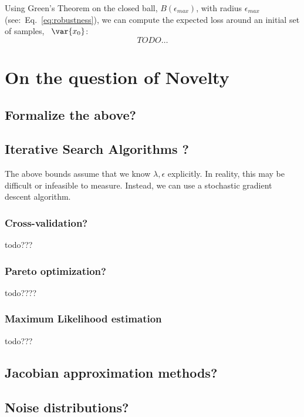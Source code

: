 \documentclass[conference]{IEEEtran}
\begin{document}
 
Using Green's Theorem on the closed ball, $B(\epsilon_{max})$, with radius $\epsilon_{max}$ (see:~Eq.~\ref{eq:robustness}), we can compute the expected loss around an initial set of samples,  ~$\var{x_0}$:
$$
TODO\dots
$$

\section{On the question of Novelty}
\subsection{Formalize the above?}
\subsection{Iterative Search Algorithms ?}
The above bounds assume that we know $\lambda, \epsilon$ explicitly. In reality, this may be difficult or infeasible to measure. Instead, we can use a stochastic gradient descent algorithm.



\subsubsection{Cross-validation?}
todo???

\subsubsection{Pareto optimization?}
todo????

\subsubsection{Maximum Likelihood estimation}
todo???

\subsection{Jacobian approximation methods?}

\subsection{Noise distributions?}

\subsection{}



% 
% 
\end{document}
